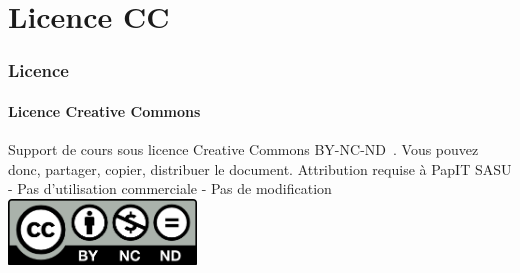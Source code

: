 \documentclass{beamer}
\begin{document}
    \section{Licence CC}\label{sec:licence}

    \begin{frame}
        \transdissolve
        \frametitle{Licence}
        \framesubtitle{Licence Creative Commons}
        Support de cours sous licence Creative Commons BY-NC-ND~.
        \bigbreak
        Vous pouvez donc, partager, copier, distribuer le document.
        \bigbreak
        Attribution requise à PapIT SASU - Pas d’utilisation commerciale - Pas de modification
        \bigbreak
        \centering
        \includegraphics[width=5cm]{image/by-nc-nd-logo}
    \end{frame}
\end{document}
